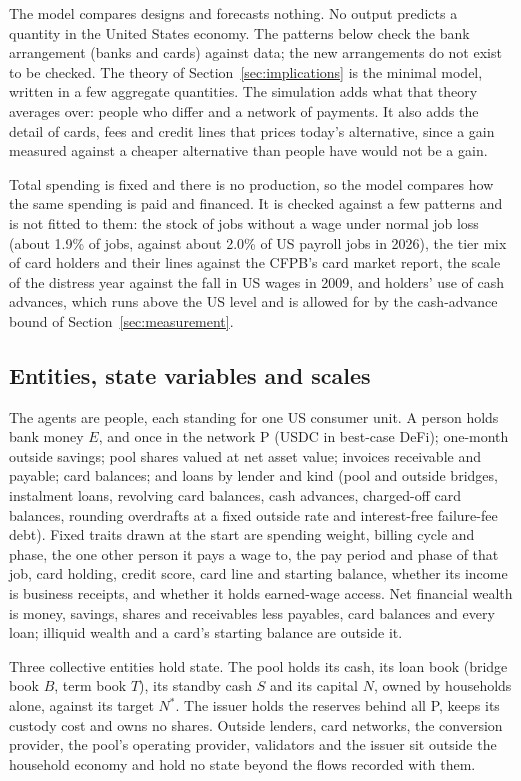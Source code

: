 The model compares designs and forecasts nothing. No output predicts a quantity in the United States
economy. The patterns below check the bank arrangement (banks and cards) against data; the new arrangements do not exist to be
checked. The theory of Section~\ref{sec:implications} is the minimal model, written in a few aggregate
quantities. The simulation adds what that theory averages over: people who differ and a network of payments. It also adds
the detail of cards, fees and credit lines that prices today's alternative, since a gain measured against a cheaper
alternative than people have would not be a gain.

Total spending is fixed and there is no production, so the model compares how the same spending is paid and
financed. It is checked against a few patterns and is not fitted to them: the stock of jobs
without a wage under normal job loss (about 1.9\% of jobs, against about 2.0\% of US payroll jobs in 2026), the
tier mix of card holders and their lines against the CFPB's card market report, the scale of the distress year
against the fall in US wages in 2009, and holders' use of cash advances, which runs above the US level and is
allowed for by the cash-advance bound of Section~\ref{sec:measurement}.

\subsection{Entities, state variables and scales}

The agents are people, each standing for one US consumer unit. A person holds bank money $E$, and once in the
network P (USDC in best-case DeFi); one-month outside savings; pool shares valued at net asset value; invoices
receivable and payable; card balances; and loans by lender and kind (pool and outside bridges, instalment loans,
revolving card balances, cash advances, charged-off card balances, rounding overdrafts at a fixed outside rate and
interest-free failure-fee debt). Fixed traits drawn at the start are spending weight, billing cycle and phase, the
one other person it pays a wage to, the pay period and phase of that job, card holding, credit score, card line and
starting balance, whether its income is business receipts, and whether it holds earned-wage access. Net financial
wealth is money, savings, shares and receivables less payables, card balances and every loan; illiquid wealth and a
card's starting balance are outside it.

Three collective entities hold state. The pool holds its cash, its loan book (bridge book $B$, term book $T$), its
standby cash $S$ and its capital $N$, owned by households alone, against its target $N^{*}$. The issuer holds the
reserves behind all P, keeps its custody cost and owns no shares. Outside lenders, card networks, the conversion
provider, the pool's operating provider, validators and the issuer sit outside the household economy and hold no
state beyond the flows recorded with them.

